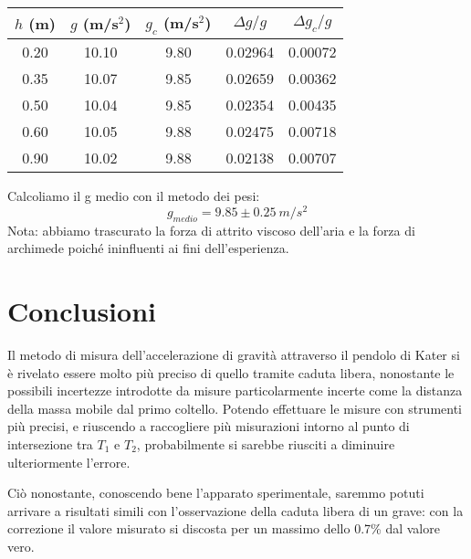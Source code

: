 \begin{center}
\begin{tabular}{c|c|c|c|c}
$h$ (m) & $g$ (m/s$^2$) & $g_c$ (m/s$^2$) & $\Delta g/g$ & $\Delta g_c/g$\\
\midrule
0.20 & 10.10 & 9.80 & 0.02964 & 0.00072 \\
0.35 & 10.07 & 9.85 & 0.02659 & 0.00362 \\
0.50 & 10.04 & 9.85 & 0.02354 & 0.00435 \\
0.60 & 10.05 & 9.88 & 0.02475 & 0.00718 \\
0.90 & 10.02 & 9.88 & 0.02138 & 0.00707 \\
\end{tabular}
\end{center}
Calcoliamo il g medio con il metodo dei pesi: 
$$ g_{medio} = 9.85 \pm 0.25 \ m/s^2  $$
Nota: abbiamo trascurato la forza di attrito viscoso dell'aria e la forza di archimede poiché ininfluenti ai fini dell'esperienza.

\section{Conclusioni}

Il metodo di misura dell'accelerazione di gravità attraverso il pendolo di Kater si è rivelato essere molto più preciso di quello tramite caduta libera, nonostante le possibili incertezze introdotte da misure particolarmente incerte come la distanza della massa mobile dal primo coltello. Potendo effettuare le misure con strumenti più precisi, e riuscendo a raccogliere più misurazioni intorno al punto di intersezione tra $T_1$ e $T_2$, probabilmente si sarebbe riusciti a diminuire ulteriormente l'errore. 

Ciò nonostante, conoscendo bene l'apparato sperimentale, saremmo potuti arrivare a risultati simili con l'osservazione della caduta libera di un grave: con la correzione il valore misurato si discosta per un massimo dello 0.7\% dal valore vero.
